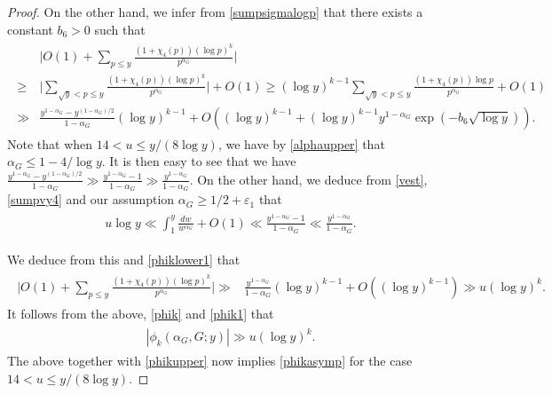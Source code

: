 \documentclass[twoside,leqno,10pt, A4]{amsart}
\begin{document}
\begin{proof}
  On the other hand, we infer from \eqref{sumpsigmalogp} that there exists a constant $b_6>0$ such that
\begin{align}
\label{phiklower1}
\begin{split}
  & \Big|O(1)+\sum_{p \leq y}\frac {(1+\chi_4(p))(\log p)^k}{p^{\alpha_G}}\Big | \\
\geq & \Big |\sum_{\sqrt{y} < p \leq y}\frac {(1+\chi_4(p))(\log p)^k}{p^{\alpha_G}}\Big |+O(1)
  \geq (\log y)^{k-1} \sum_{\sqrt{y} < p \leq y}\frac {(1+\chi_4(p))\log p}{p^{\alpha_G}}+O(1) \\
  \gg &  \frac {y^{1-\alpha_G}-y^{(1-\alpha_G)/2}}{1-\alpha_G}(\log y)^{k-1} +O((\log y)^{k-1} +(\log y)^{k-1}y^{1-\alpha_G}\exp(-b_6\sqrt{\log y})). 
\end{split}
\end{align}      
   Note that when $14 < u \leq y/(8\log y)$, we have by \eqref{alphaupper} that $\alpha_G \leq 1-4/\log y$. It is then easy to see that we have $\frac {y^{1-\alpha_G}-y^{(1-\alpha_G)/2}}{1-\alpha_G} \gg \frac {y^{1-\alpha_G}-1}{1-\alpha_G} \gg \frac {y^{1-\alpha_G}}{1-\alpha_G} $. On the other hand, we deduce from \eqref{vest}, \eqref{sumpvy4} and our assumption $\alpha_G \geq 1/2+\varepsilon_1$ that 
\begin{align*}
\begin{split}
 u \log y \ll \int^y_1\frac {dw}{w^{\alpha_G}}+O(1) \ll \frac {y^{1-\alpha_G}-1}{1-\alpha_G} \ll \frac {y^{1-\alpha_G}}{1-\alpha_G}. 
\end{split}
\end{align*}      

   We deduce from this and \eqref{phiklower1} that 
\begin{align*}
\begin{split}
  \Big|O(1)+\sum_{p \leq y}\frac {(1+\chi_4(p))(\log p)^k}{p^{\alpha_G}}\Big | 
  \gg &  \frac {y^{1-\alpha_G}}{1-\alpha_G}(\log y)^{k-1}+O((\log y)^{k-1}) \gg u(\log y)^{k}. 
\end{split}
\end{align*}      
    It follows from the above, \eqref{phik} and \eqref{phik1} that 
\begin{align}
\label{phiklower}
\begin{split}
  |\phi_k(\alpha_G,G;y)| \gg u(\log y)^{k}.
\end{split}
\end{align}    
  The above together with \eqref{phikupper} now implies \eqref{phikasymp} for the case $14 < u \leq y/(8\log y)$. 
  

\end{proof}
\end{document}
